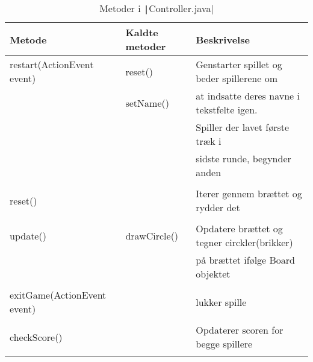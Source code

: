 \begin{table}[H]
    \centering
    \caption{Metoder i \texttt|Controller.java|}\label{tbl:2}
    \begin{tabular}{lll}
        \toprule
        Metode                               & Kaldte metoder  & Beskrivelse                                               \\
        \midrule
        restart(ActionEvent event)           & reset()         & Genstarter spillet og beder spillerene om                 \\
                                             & setName()       & at indsatte deres navne  i tekstfelte igen.               \\
                                             &                 & Spiller der lavet første træk i                           \\
                                             &                 & sidste runde, begynder anden                              \\
                                             &                 &                                                           \\
        reset()                              &                 & Iterer gennem brættet og rydder det                       \\
                                             &                 &                                                           \\
        update()                             & drawCircle()    & Opdatere brættet og tegner circkler(brikker)              \\
                                             &                 & på brættet ifølge Board objektet                          \\
                                             &                 &                                                           \\
        exitGame(ActionEvent event)          &                 & lukker spille                                             \\
                                             &                 &                                                           \\
        checkScore()                         &                 & Opdaterer scoren for begge spillere                       \\
                                             &                 &                                                           \\

\end{tabular}
\end{table}
